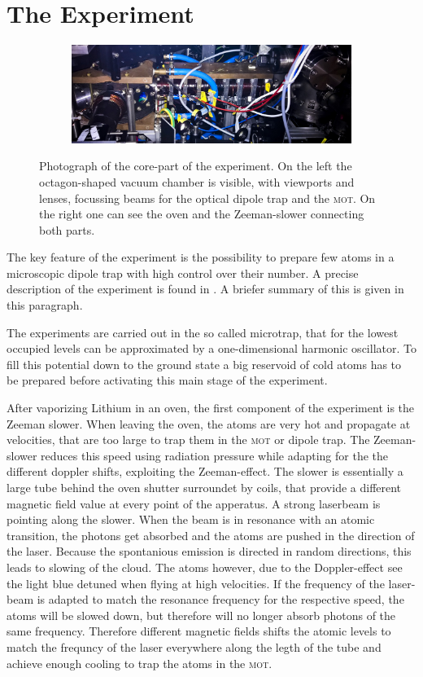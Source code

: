 \chapter{The Experiment}

\begin{figure}[h]
\centering
\begin{subfigure}[b]{0.8\textwidth}
                \includegraphics[width=\textwidth]{experiment}
\end{subfigure}
\caption{Photograph of the core-part of the experiment. On the left the octagon-shaped vacuum chamber is visible, with viewports and lenses, focussing beams for the optical dipole trap and the \textsc{mot}. On the right one can see the oven and the Zeeman-slower connecting both parts.}
\label{experiment}
\end{figure}
The key feature of the experiment is the possibility to prepare few atoms in a microscopic dipole trap with high control over their number. A precise description of the experiment is found in \cite{friedhelm}. A briefer summary of this is given in this paragraph.

The experiments are carried out in the so called microtrap, that for the lowest occupied levels can be approximated by a one-dimensional harmonic oscillator. To fill this potential down to the ground state a big reservoid of cold atoms has to be prepared before activating this main stage of the experiment.

After vaporizing Lithium in an oven, the first component of the experiment is the Zeeman slower. When leaving the oven, the atoms are very hot and propagate at velocities, that are too large to trap them in the \textsc{mot} or dipole trap. The Zeeman-slower reduces this speed using radiation pressure while adapting for the the different doppler shifts, exploiting the Zeeman-effect. The slower is essentially a large tube behind the oven shutter surroundet by coils, that provide a different magnetic field value at every point of the apperatus. A strong laserbeam is pointing along the slower. When the beam is in resonance with an atomic transition, the photons get absorbed and the atoms are pushed in the direction of the laser. Because the spontanious emission is directed in random directions, this leads to slowing of the cloud. The atoms however, due to the Doppler-effect see the light blue detuned when flying at high velocities. If the frequency of the laser-beam is adapted to match the resonance frequency for the respective speed, the atoms will be slowed down, but therefore will no longer absorb photons of the same frequency. Therefore different magnetic fields shifts the atomic levels to match the frequncy of the laser everywhere along the legth of the tube and achieve enough cooling to trap the atoms in the \textsc{mot}. 

